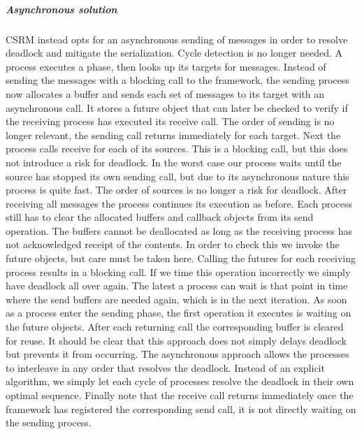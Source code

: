 \subparagraph{Asynchronous solution}
CSRM instead opts for an asynchronous sending of messages in order to resolve deadlock and mitigate the serialization. Cycle detection is no longer needed. 
A process executes a phase, then looks up its targets for messages. Instead of sending the messages with a blocking call to the framework, the sending process now allocates a buffer and sends each set of messages to its target with an asynchronous call. It stores a future object that can later be checked to verify if the receiving process has executed its receive call. 
The order of sending is no longer relevant, the sending call returns immediately for each target. 
Next the process calls receive for each of its sources. This is a blocking call, but this does not introduce a risk for deadlock.
In the worst case our process waits until the source has stopped its own sending call, but due to its asynchronous nature this process is quite fast. The order of sources is no longer a risk for deadlock. After receiving all messages the process continues its execution as before.
Each process still has to clear the allocated buffers and callback objects from its send operation. The buffers cannot be deallocated as long as the receiving process has not acknowledged receipt of the contents. In order to check this we invoke the future objects, but care must be taken here. Calling the futures for each receiving process results in a blocking call. If we time this operation incorrectly we simply have deadlock all over again. The latest a process can wait is that point in time where the send buffers are needed again, which is in the next iteration. As soon as a process enter the sending phase, the first operation it executes is waiting on the future objects. After each returning call the corresponding buffer is cleared for reuse. 
It should be clear that this approach does not simply delays deadlock but prevents it from occurring. The asynchronous approach allows the processes to interleave in any order that resolves the deadlock. Instead of an explicit algorithm, we simply let each cycle of processes resolve the deadlock in their own optimal sequence. Finally note that the receive call returns immediately once the framework has registered the corresponding send call, it is not directly waiting on the sending process.

